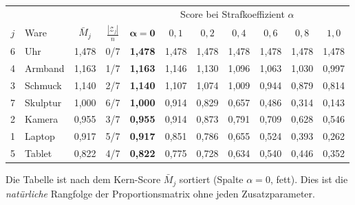 \documentclass[a4paper,11pt]{article}
\begin{document}
\begin{center}
\small
\renewcommand{\arraystretch}{1.15}
\begin{tabular}{cl cc ccccccc}
\toprule
& & & & \multicolumn{7}{c}{Score bei Strafkoeffizient $\alpha$} \\
\cmidrule(lr){5-11}
$j$ & Ware & $\bar{M}_j$ & $\frac{|\mathcal{Z}_j|}{n}$
  & $\mathbf{\alpha{=}0}$ & $0{,}1$ & $0{,}2$ & $0{,}4$
  & $0{,}6$ & $0{,}8$ & $1{,}0$ \\
\midrule
6 & Uhr      & 1{,}478 & 0/7 &
  \textbf{1{,}478} & 1{,}478 & 1{,}478 & 1{,}478 & 1{,}478 & 1{,}478 & 1{,}478 \\
4 & Armband  & 1{,}163 & 1/7 &
  \textbf{1{,}163} & 1{,}146 & 1{,}130 & 1{,}096 & 1{,}063 & 1{,}030 & 0{,}997 \\
3 & Schmuck  & 1{,}140 & 2/7 &
  \textbf{1{,}140} & 1{,}107 & 1{,}074 & 1{,}009 & 0{,}944 & 0{,}879 & 0{,}814 \\
7 & Skulptur & 1{,}000 & 6/7 &
  \textbf{1{,}000} & 0{,}914 & 0{,}829 & 0{,}657 & 0{,}486 & 0{,}314 & 0{,}143 \\
2 & Kamera   & 0{,}955 & 3/7 &
  \textbf{0{,}955} & 0{,}914 & 0{,}873 & 0{,}791 & 0{,}709 & 0{,}628 & 0{,}546 \\
1 & Laptop   & 0{,}917 & 5/7 &
  \textbf{0{,}917} & 0{,}851 & 0{,}786 & 0{,}655 & 0{,}524 & 0{,}393 & 0{,}262 \\
5 & Tablet   & 0{,}822 & 4/7 &
  \textbf{0{,}822} & 0{,}775 & 0{,}728 & 0{,}634 & 0{,}540 & 0{,}446 & 0{,}352 \\
\bottomrule
\end{tabular}
\end{center}

\noindent
Die Tabelle ist nach dem Kern-Score $\bar{M}_j$ sortiert
(Spalte $\alpha=0$, fett). Dies ist die \emph{natürliche}
Rangfolge der Proportionsmatrix ohne jeden Zusatzparameter.
\end{document}
